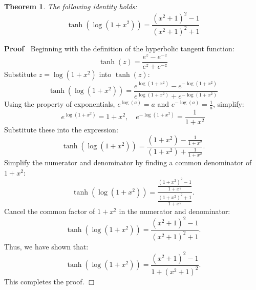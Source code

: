 \documentclass{article}
\newenvironment{proof}{\noindent\textbf{Proof\ }}{\hspace*{\fill}$\Box$\medskip}
\newtheorem{theorem}{Theorem}
\begin{document}
\begin{theorem}
  The following identity holds:
  \begin{equation}
    \tanh (\log (1 + x^2)) = \frac{(x^2 + 1)^2 - 1}{(x^2 + 1)^2 + 1}
  \end{equation}
\end{theorem}

\begin{proof}
  Beginning with the definition of the hyperbolic tangent function:
  \begin{equation}
    \tanh (z) = \frac{e^z - e^{- z}}{e^z + e^{- z}}
  \end{equation}
  Substitute $z = \log (1 + x^2)$ into $\tanh (z)$:
  \begin{equation}
    \tanh (\log (1 + x^2)) = \frac{e^{\log (1 + x^2)} - e^{- \log (1 +
    x^2)}}{e^{\log (1 + x^2)} + e^{- \log (1 + x^2)}}
  \end{equation}
  Using the property of exponentials, $e^{\log (a)} = a$ and $e^{- \log (a)} =
  \frac{1}{a}$, simplify:
  \begin{equation}
    e^{\log (1 + x^2)} = 1 + x^2, \quad e^{- \log (1 + x^2)} = \frac{1}{1 +
    x^2}
  \end{equation}
  Substitute these into the expression:
  \[ \tanh (\log (1 + x^2)) = \frac{(1 + x^2) - \frac{1}{1 + x^2}}{(1 + x^2) +
     \frac{1}{1 + x^2}} . \]
  Simplify the numerator and denominator by finding a common denominator of $1
  + x^2$:
  \[ \tanh (\log (1 + x^2)) = \frac{\frac{(1 + x^2)^2 - 1}{1 + x^2}}{\frac{(1
     + x^2)^2 + 1}{1 + x^2}} . \]
  Cancel the common factor of $1 + x^2$ in the numerator and denominator:
  \[ \tanh (\log (1 + x^2)) = \frac{(x^2 + 1)^2 - 1}{(x^2 + 1)^2 + 1} . \]
  Thus, we have shown that:
  \[ \tanh (\log (1 + x^2)) = \frac{(x^2 + 1)^2 - 1}{1 + (x^2 + 1)^2} . \]
  This completes the proof.
\end{proof}
\end{document}

